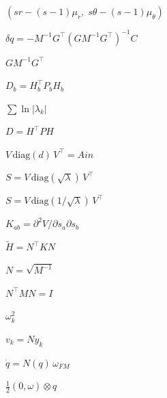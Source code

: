 \documentclass{article}
\begin{document}
$ (s r - (s-1)\mu_r,\; s\theta - (s-1)\mu_\theta) $
\pagebreak

$ \delta q = -M^{-1} G^\top (G M^{-1} G^\top)^{-1} C $
\pagebreak

$ G M^{-1} G^\top $
\pagebreak

$ D_b = H_b^\top P_b H_b $
\pagebreak

$ \sum \ln|\lambda_k| $
\pagebreak

$ D = H^\top P H $
\pagebreak

$ V \, \mathrm{diag}(d) \, V^\top = Ain $
\pagebreak

$ S = V \, \mathrm{diag}(\sqrt{\lambda}) \, V^\top $
\pagebreak

$ S = V \, \mathrm{diag}(1/\sqrt{\lambda}) \, V^\top $
\pagebreak

$ K_{ab} = \partial^2 V / \partial s_a \partial s_b $
\pagebreak

$ \tilde H = N^\top K N $
\pagebreak

$ N = \sqrt{M^{-1}} $
\pagebreak

$ N^\top M N = I $
\pagebreak

$ \omega_k^2 $
\pagebreak

$ v_k = N y_k $
\pagebreak

$ \dot q = N(q)\,\omega_{FM} $
\pagebreak

$ \tfrac12 (0,\omega)\otimes q $
\pagebreak
\end{document}
